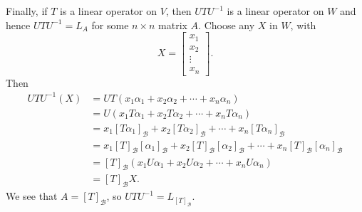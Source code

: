 \begin{solution}
  Finally, if $T$ is a linear operator on $V$, then $UTU^{-1}$ is a
  linear operator on $W$ and hence $UTU^{-1} = L_A$ for some
  $n\times n$ matrix $A$. Choose any $X$ in $W$, with
  \begin{equation*}
    X =
    \begin{bmatrix}
      x_1 \\ x_2 \\ \vdots \\ x_n
    \end{bmatrix}.
  \end{equation*}
  Then
  \begin{align*}
    UTU^{-1}(X)
    &= UT(x_1\alpha_1 + x_2\alpha_2 + \cdots + x_n\alpha_n) \\
    &= U(x_1T\alpha_1 + x_2T\alpha_2 + \cdots + x_nT\alpha_n) \\
    &= x_1[T\alpha_1]_{\mathcal{B}} + x_2[T\alpha_2]_{\mathcal{B}}
      + \cdots + x_n[T\alpha_n]_{\mathcal{B}} \\
    &= x_1[T]_{\mathcal{B}}[\alpha_1]_{\mathcal{B}}
      + x_2[T]_{\mathcal{B}}[\alpha_2]_{\mathcal{B}}
      + \cdots
      + x_n[T]_{\mathcal{B}}[\alpha_n]_{\mathcal{B}} \\
    &= [T]_{\mathcal{B}}(x_1U\alpha_1 + x_2U\alpha_2
      + \cdots + x_nU\alpha_n) \\
    &= [T]_{\mathcal{B}}X.
  \end{align*}
  We see that $A = [T]_{\mathcal{B}}$, so
  $UTU^{-1} = L_{[T]_{\mathcal{B}}}$.
\end{solution}

